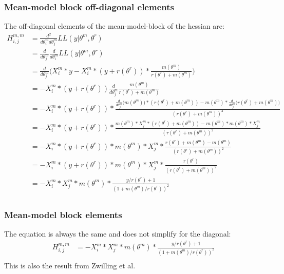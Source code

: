 \documentclass[bibliography=totoc,10pt]{scrartcl}
\begin{document}
\subsubsection{Mean-model block off-diagonal elements}
The off-diagonal elements of the mean-model-block of the hessian are:
\begin{equation}
\begin{split}
H^{m,m}_{i,j} &= \frac{d^2}{d \theta^m_i d \theta^m_j} LL(y|\theta^m, \theta^r) \\
&= \frac{d}{d \theta^m_j} \frac{d}{d \theta^m_i} LL(y|\theta^m, \theta^r) \\
&= \frac{d}{d \theta^m_j} \bigg( X^m_{i}*y - X^m_{i}*(y+r(\theta^r))*\frac{m(\theta^m)}{r(\theta^r)+m(\theta^m)} \bigg) \\
&= -X^m_{i}*(y+r(\theta^r)) \frac{d}{d \theta^m_j} \frac{m(\theta^m)}{r(\theta^r)+m(\theta^m)} \\
&=  -X^m_{i}*(y+r(\theta^r))* \frac{\frac{d}{d \theta^m_j} \bigg(m(\theta^m) \bigg) * (r(\theta^r)+m(\theta^m)) - m(\theta^m)* \frac{d}{d \theta^m_j} \bigg(r(\theta^r)+m(\theta^m) \bigg)}{(r(\theta^r)+m(\theta^m))^2 } \\
&=  -X^m_{i}*(y+r(\theta^r))* \frac{ m(\theta^m) * X^m_{j}  * (r(\theta^r)+m(\theta^m)) - m(\theta^m)* m(\theta^m) * X^m_{j} }{(r(\theta^r)+m(\theta^m))^2 } \\
&=  -X^m_{i}*(y+r(\theta^r))* m(\theta^m) * X^m_{j} * \frac{ r(\theta^r)+m(\theta^m) - m(\theta^m)}{(r(\theta^r)+m(\theta^m))^2 } \\
&=  -X^m_{i}*(y+r(\theta^r))* m(\theta^m) * X^m_{j} * \frac{ r(\theta^r)}{(r(\theta^r)+m(\theta^m))^2 } \\
&=  -X^m_{i}* X^m_{j} * m(\theta^m) * \frac{y/r(\theta^r)+1}{(1+m(\theta^m)/r(\theta^r))^2 } \\
\end{split}
\end{equation}

\subsubsection{Mean-model block elements}
The equation is always the same and does not simplify for the diagonal:
\begin{equation}
\begin{split}
H^{m,m}_{i,j} &=  -X^m_{i}* X^m_{j} * m(\theta^m) * \frac{y/r(\theta^r)+1}{(1+m(\theta^m)/r(\theta^r))^2 } \\
\end{split}
\end{equation}
This is also the result from Zwilling et al.
\end{document}

